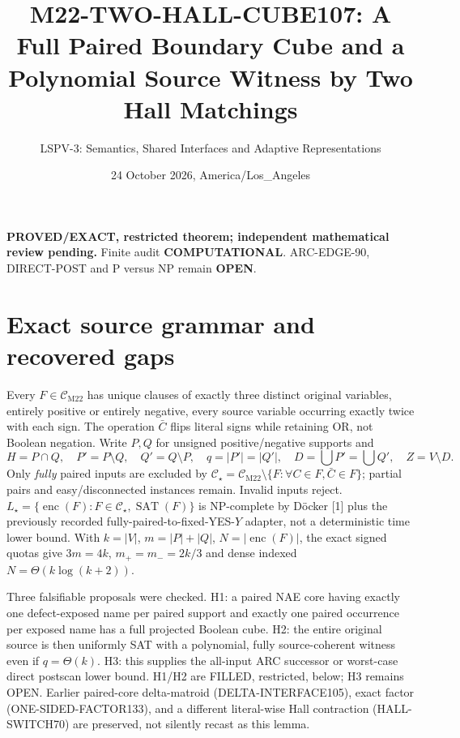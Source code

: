 \documentclass[11pt]{article}
\title{M22-TWO-HALL-CUBE107: A Full Paired Boundary Cube and a Polynomial Source Witness by Two Hall Matchings}
\author{LSPV-3: Semantics, Shared Interfaces and Adaptive Representations}
\date{24 October 2026, America/Los\_Angeles}
\newcommand{\CM}{\mathcal C_{\mathrm{M22}}}
\newcommand{\CS}{\mathcal C_\star}
\newcommand{\SAT}{\operatorname{SAT}}
\begin{document}
\maketitle
\noindent\textbf{PROVED/EXACT, restricted theorem; independent mathematical review pending.}
Finite audit \textbf{COMPUTATIONAL}. ARC-EDGE-90, DIRECT-POST and P versus NP remain \textbf{OPEN}.

\section{Exact source grammar and recovered gaps}
Every $F\in\CM$ has unique clauses of exactly three distinct original variables, entirely positive or entirely negative, every source variable occurring exactly twice with each sign. The operation $\bar C$ flips literal signs while retaining OR, not Boolean negation. Write $P,Q$ for unsigned positive/negative supports and
\[
H=P\cap Q,\quad P'=P\setminus Q,\quad Q'=Q\setminus P,\quad
q=|P'|=|Q'|,\quad D=\bigcup P'=\bigcup Q',\quad Z=V\setminus D.
\]
Only \emph{fully} paired inputs are excluded by $\CS=\CM\setminus\{F:\forall C\in F,\bar C\in F\}$; partial pairs and easy/disconnected instances remain. Invalid inputs reject. $L_\star=\{\operatorname{enc}(F):F\in\CS,\SAT(F)\}$ is NP-complete by D\"ocker [1] plus the previously recorded fully-paired-to-fixed-YES-$Y$ adapter, not a deterministic time lower bound. With $k=|V|$, $m=|P|+|Q|$, $N=|\operatorname{enc}(F)|$, the exact signed quotas give $3m=4k$, $m_+=m_-=2k/3$ and dense indexed $N=\Theta(k\log(k+2))$.

Three falsifiable proposals were checked. H1: a paired NAE core having exactly one defect-exposed name per paired support and exactly one paired occurrence per exposed name has a full projected Boolean cube. H2: the entire original source is then uniformly SAT with a polynomial, fully source-coherent witness even if $q=\Theta(k)$. H3: this supplies the all-input ARC successor or worst-case direct postscan lower bound. H1/H2 are FILLED, restricted, below; H3 remains OPEN. Earlier paired-core delta-matroid (DELTA-INTERFACE105), exact factor (ONE-SIDED-FACTOR133), and a different literal-wise Hall contraction (HALL-SWITCH70) are preserved, not silently recast as this lemma.
\end{document}
